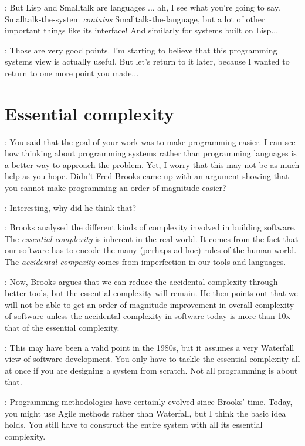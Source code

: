 \documentclass[runningheads]{llncs}
\newcommand{\T}{Tomas}
\newcommand{\J}{Joel}
\newcommand{\says}[2][gg]{\vspace{0.5em}\noindent\hangindent=0.5cm{\textsc{#1}}: #2}
\begin{document}
\says[\T]{But Lisp and Smalltalk are languages ... ah, I see what you're going to say. Smalltalk-the-system \emph{contains} Smalltalk-the-language, but a lot of other important things like its interface! And similarly for systems built on Lisp...}

\says[\T]{Those are very good points. I'm starting to believe that this programming systems view is actually useful. But let's return to it later, because I wanted to return to one more point you made...}

\section{Essential complexity}

\says[\T]{You said that the goal of your work was to make programming easier. I can see how thinking about programming systems rather than programming languages is a better way to approach the problem. Yet, I worry that this may not be as much help as you hope. Didn't Fred Brooks came up with an argument showing that you cannot make programming an order of magnitude easier?}

\says[\J]{Interesting, why did he think that?}

\says[\T]{Brooks \cite{brooks-1987-silver} analysed the different kinds of complexity involved in building software. The \emph{essential complexity} is inherent in the real-world. It comes from the fact that our software has to encode the many (perhaps ad-hoc) rules of the human world. The \emph{accidental compexity} comes from imperfection in our tools and languages.}

\says[\T]{Now, Brooks argues that we can reduce the accidental complexity through better tools, but the essential complexity will remain. He then points out that we will not be able to get an order of magnitude improvement in overall complexity of software unless the accidental complexity in software today is more than 10x that of the essential complexity.}

\says[\J]{This may have been a valid point in the 1980s, but it assumes a very Waterfall view of software development. You only have to tackle the essential complexity all at once if you are designing a system from scratch. Not all programming is about that.}

\says[\T]{Programming methodologies have certainly evolved since Brooks' time. Today, you might use Agile methods rather than Waterfall, but I think the basic idea holds. You still have to construct the entire system with all its essential complexity.}
\end{document}
